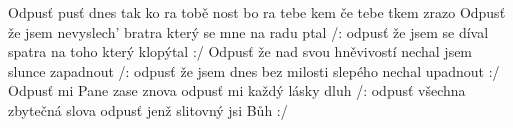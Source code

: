 \begin{TEXT}{Odpusť}
\SLOKA {}pusť dnes tak ko ra \NL
{} tobě nost bo \NL
{} ra \NL
{} tebe kem   \NL 
{} če \NL
{} tebe tkem zrazo
\SLOKA Odpusť že jsem nevyslech' bratra \NL
který se mne na radu ptal \NL
/: odpusť že jsem se díval spatra \NL
na toho který klopýtal :/ 
\SLOKA Odpusť že nad svou hněvivostí \NL
nechal jsem slunce zapadnout \NL
/: odpusť že jsem dnes bez milosti \NL
slepého nechal upadnout :/ 
\SLOKA Odpusť mi Pane zase znova \NL
odpusť mi každý lásky dluh \NL
/: odpusť všechna zbytečná slova \NL
odpusť jenž slitovný jsi Bůh :/ \NL
\end{TEXT}
